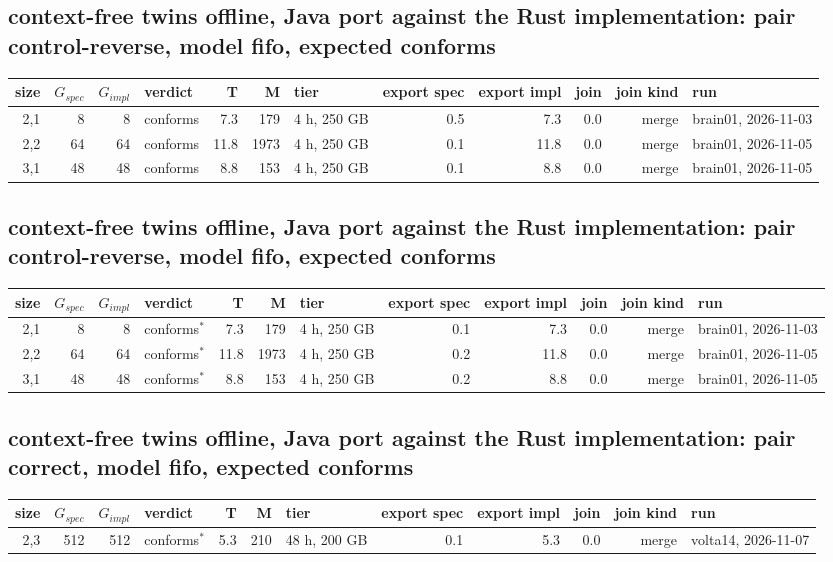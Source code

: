 \documentclass[10pt]{article}
\begin{document}
\subsection*{context-free twins offline, Java port against the Rust implementation: pair \textsf{control-reverse}, model fifo, expected conforms}
\begin{longtable}{@{}rrrlrrlrrrrl@{}}
\toprule
size & $G_{\mathit{spec}}$ & $G_{\mathit{impl}}$ & verdict & T & M & tier & export spec & export impl & join & join kind & run \\
\midrule
\endhead
\color{blue} 2,1 & 8 & 8 & conforms & 7.3 & 179 & 4 h, 250 GB & 0.5 & 7.3 & 0.0 & merge & brain01, 2026-11-03 \\
\color{blue} 2,2 & 64 & 64 & conforms & 11.8 & 1973 & 4 h, 250 GB & 0.1 & 11.8 & 0.0 & merge & brain01, 2026-11-05 \\
\color{blue} 3,1 & 48 & 48 & conforms & 8.8 & 153 & 4 h, 250 GB & 0.1 & 8.8 & 0.0 & merge & brain01, 2026-11-05 \\
\bottomrule
\end{longtable}
\subsection*{context-free twins offline, Java port against the Rust implementation: pair \textsf{control-reverse}, model fifo, expected conforms}
\begin{longtable}{@{}rrrlrrlrrrrl@{}}
\toprule
size & $G_{\mathit{spec}}$ & $G_{\mathit{impl}}$ & verdict & T & M & tier & export spec & export impl & join & join kind & run \\
\midrule
\endhead
\color{blue} 2,1 & 8 & 8 & conforms$^{\ast}$ & 7.3 & 179 & 4 h, 250 GB & 0.1 & 7.3 & 0.0 & merge & brain01, 2026-11-03 \\
\color{blue} 2,2 & 64 & 64 & conforms$^{\ast}$ & 11.8 & 1973 & 4 h, 250 GB & 0.2 & 11.8 & 0.0 & merge & brain01, 2026-11-05 \\
\color{blue} 3,1 & 48 & 48 & conforms$^{\ast}$ & 8.8 & 153 & 4 h, 250 GB & 0.2 & 8.8 & 0.0 & merge & brain01, 2026-11-05 \\
\bottomrule
\end{longtable}
\subsection*{context-free twins offline, Java port against the Rust implementation: pair \textsf{correct}, model fifo, expected conforms}
\begin{longtable}{@{}rrrlrrlrrrrl@{}}
\toprule
size & $G_{\mathit{spec}}$ & $G_{\mathit{impl}}$ & verdict & T & M & tier & export spec & export impl & join & join kind & run \\
\midrule
\endhead
\color{red} 2,3 & 512 & 512 & conforms$^{\ast}$ & 5.3 & 210 & 48 h, 200 GB & 0.1 & 5.3 & 0.0 & merge & volta14, 2026-11-07 \\
\bottomrule
\end{longtable}
\end{document}
